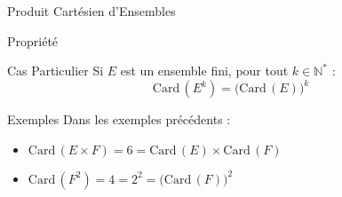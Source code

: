 \documentclass{cours}
\begin{document}
\begin{Gpartie}{Produit Cartésien d'Ensembles}
\begin{Spartie}{Propriété}
            \begin{SSpartie}{Cas Particulier}
                Si $E$ est un ensemble fini, pour tout $k\in\mathbb{N^*}$ :
                \[\mathrm{Card}\,\left(E^k\right)=\big(\mathrm{Card}\,(E)\big)^k\]
            \end{SSpartie}
            \begin{SSpartie}{Exemples}
                Dans les exemples précédents :
                \begin{itemize}
                    \item $\mathrm{Card}\,(E\times F)=6=\mathrm{Card}\,(E)\times\mathrm{Card}\,(F)$
                    \item $\mathrm{Card}\,\left(F^2\right)=4=2^2=\big(\mathrm{Card}\,(F)\big)^2$
                \end{itemize}
            \end{SSpartie}
        \end{Spartie}
    \end{Gpartie}
\end{document}
